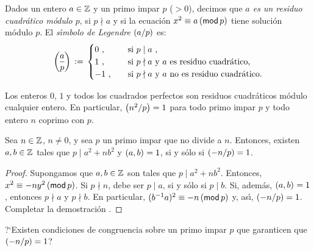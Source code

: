 \begin{defEcuacion}\label{def:ecuacion:legendre}
	Dados un entero $a\in\Enteros$ y un primo impar $p$ ($>0$), decimos
	que \emph{$a$ es un residuo cuadr\'atico m\'odulo $p$}, si
	$p\nmid a$ y si la ecuaci\'on $x^2\equiv a\tmodulo[p]$ tiene
	soluci\'on m\'odulo $p$. El \emph{s\'{\i}mbolo de Legendre}
	$\tlegendre a{p}$ es:
	\begin{displaymath}
		\legendre a{p}\,:=\,
			\begin{cases}
				0\text{ ,} & \quad\text{si }
					p\mid a \text{ ,} \\
				1\text{ ,} & \quad\text{si }
					p\nmid a\text{ y }a
					\text{ es residuo cuadr\'atico,} \\
				-1\text{ ,} & \quad\text{si }
					p\nmid a\text{ y }a
					\text{ no es residuo cuadr\'atico.}
			\end{cases}
	\end{displaymath}
\end{defEcuacion}

\begin{obsEcuacion}\label{obs:ecuacion:residuos}
	Los enteros $0$, $1$ y todos los cuadrados perfectos son residuos
	cuadr\'aticos m\'odulo cualquier entero. En particular,
	$\tlegendre{n^2} p=1$ para todo primo impar $p$ y todo entero $n$
	coprimo con $p$.
\end{obsEcuacion}

\begin{lemaEcuacion}\label{lema:ecuacion:legendre}
	Sea $n\in\Enteros$, $n\neq 0$, y sea $p$ un primo impar que no
	divide a $n$. Entonces, existen $a,b\in\Enteros$ tales que
	$p\mid a^2+nb^2$ y $\mcd{a,b}=1$, si y s\'olo si $\tlegendre{-n} p=1$.
\end{lemaEcuacion}

\begin{proof}
	Supongamos que $a,b\in\Enteros$ son tales que $p\mid a^2+nb^2$.
	Entonces, $x^2\equiv -ny^2\tmodulo[p]$. Si $p\nmid n$,
	debe ser $p\mid a$, si y s\'olo si $p\mid b$. Si, adem\'as,
	$\mcd{a,b}=1$, entonces $p\nmid a$ y $p\nmid b$. En particular,
	$(b^{-1}a)^2\equiv -n\tmodulo[p]$ y, as\'{\i},
	$\tlegendre{-n} p=1$. Completar la demostraci\'on \quedacomoejercicio.
\end{proof}

\begin{pregEcuacion}\label{preg:ecuacion}
	?`Existen condiciones de congruencia sobre un primo impar $p$
	que garanticen que $\tlegendre{-n} p=1$?
\end{pregEcuacion}

